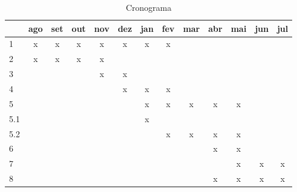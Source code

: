 \documentclass[
	12pt,				%
	openany,
	oneside,
	a4paper,			%
	english,			%
	brazil,				%
	]{abntex2}
\begin{document}
\begin{table}[H]
\caption{Cronograma}
\centering
	\begin{tabular}{|l||c|c|c|c|c|c|c|c|c|c|c|c|}
		\hline 
		   &ago&set&out&nov&dez&jan&fev&mar&abr&mai&jun&jul\\
		\hline 
		1  & x & x & x & x & x & x & x &  &  &  &  &  \\ 
		2  & x & x & x & x &  &  &  &  &  &  &  &  \\ 
		3  &  &  &  & x & x &  &  &  &  &  &  &  \\ 
		4  &  &  &  &  & x & x & x &  &  &  &  &  \\ 
		5  &  &  &  &  &  & x & x & x & x & x &  &  \\ 
		5.1  &  &  &  &  &  & x &  &  &  &  &  &  \\ 
		5.2  &  &  &  &  &  &  & x & x & x & x &  &  \\ 
		6 &  &  &  &  &  &  &  &  & x & x &  &  \\ 
		7  &  &  &  &  &  &  &  &  &  & x & x & x \\ 
		8 &  &  &  &  &  &  &  &  & x & x & x & x \\ 
		\hline 
	\end{tabular} 
\label{tab:cronograma}
\end{table}


\end{document}

